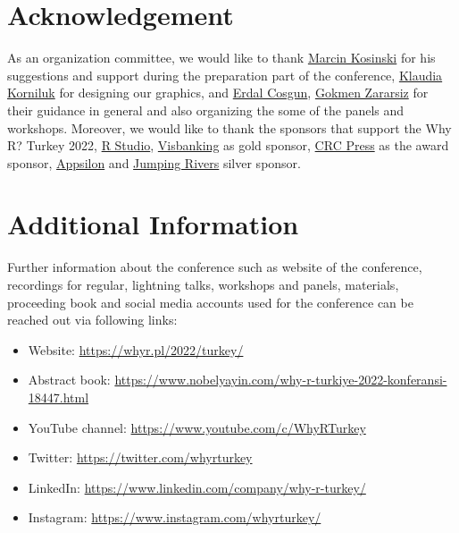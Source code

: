 \hypertarget{acknowledgement}{%
\section{Acknowledgement}\label{acknowledgement}}

As an organization committee, we would like to thank \href{https://www.linkedin.com/in/mkosinski/}{Marcin Kosinski} for his suggestions and support during the preparation part of the conference, \href{https://www.linkedin.com/in/klaudia-korniluk/}{Klaudia Korniluk} for designing our graphics, and \href{https://www.microsoft.com/en-us/research/people/ercosgun/}{Erdal Cosgun}, \href{https://avesis.erciyes.edu.tr/gokmenzararsiz}{Gokmen Zararsiz} for their guidance in general and also organizing the some of the panels and workshops. Moreover, we would like to thank the sponsors that support the Why R? Turkey 2022, \href{https://www.rstudio.com/}{R Studio}, \href{https://visbanking.com/}{Visbanking} as gold sponsor, \href{https://www.routledge.com/go/crc-press}{CRC Press} as the award sponsor, \href{https://appsilon.com/}{Appsilon} and \href{https://www.jumpingrivers.com/}{Jumping Rivers} silver sponsor.

\hypertarget{additional-information}{%
\section{Additional Information}\label{additional-information}}

Further information about the conference such as website of the conference, recordings for regular, lightning talks, workshops and panels, materials, proceeding book and social media accounts used for the conference can be reached out via following links:

\begin{itemize}
\tightlist
\item
  Website: \url{https://whyr.pl/2022/turkey/}
\item
  Abstract book: \url{https://www.nobelyayin.com/why-r-turkiye-2022-konferansi-18447.html}
\item
  YouTube channel: \url{https://www.youtube.com/c/WhyRTurkey}
\item
  Twitter: \url{https://twitter.com/whyrturkey}
\item
  LinkedIn: \url{https://www.linkedin.com/company/why-r-turkey/}
\item
  Instagram: \url{https://www.instagram.com/whyrturkey/}
\end{itemize}

